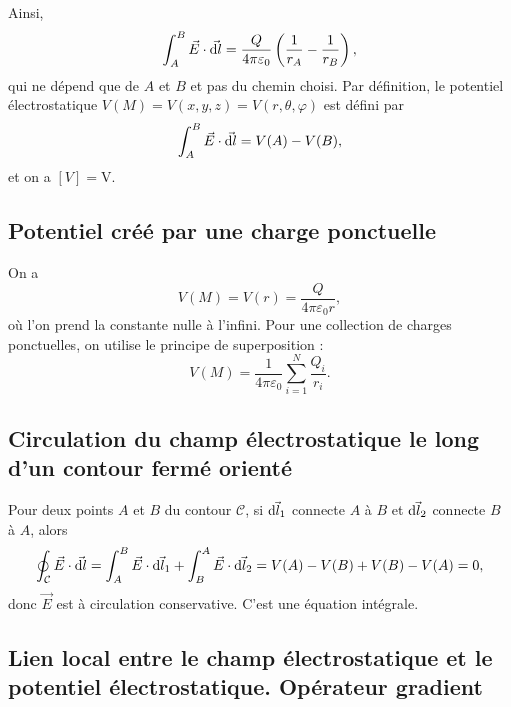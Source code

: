         Ainsi,
        \begin{equation}
            \int_{A}^{B}\vec{E}\cdot\vec{\mathrm{d} l}=\frac{Q}{4\pi\varepsilon_{0}}\left(\frac{1}{r_{A}}-\frac{1}{r_{B}}\right),
        \end{equation}
        qui ne dépend que de $A$ et $B$ et pas du chemin choisi. Par définition, le potentiel électrostatique $V(M)=V(x,y,z)=V(r,\theta,\varphi)$ est défini par 
        \begin{equation}
            \int_{A}^{B}\vec{E}\cdot\vec{\mathrm{d} l}=V(A)-V(B),
        \end{equation}
        et on a $[V]=\si{\volt}$.

    \subsection{Potentiel créé par une charge ponctuelle}

        On a 
        \begin{equation}
            \boxed{
                V(M)=V(r)=\frac{Q}{4\pi\varepsilon_{0}r},
            }
        \end{equation}
        où l'on prend la constante nulle à l'infini. Pour une collection de charges ponctuelles, on utilise le principe de superposition :
        \begin{equation}
            \boxed{
                V(M)=\frac{1}{4\pi\varepsilon_{0}}\sum_{i=1}^{N}\frac{Q_i}{r_i}.
            }
        \end{equation}

    \subsection{Circulation du champ électrostatique le long d'un contour fermé orienté}

        Pour deux points $A$ et $B$ du contour $\mathcal{C}$, si $\vec{\mathrm{d} l_{1}}$ connecte $A$ à $B$ et $\vec{\mathrm{d} l_{2}}$ connecte $B$ à $A$, alors 
        \begin{equation}
            \oint_{\mathcal{C}}\vec{E}\cdot\vec{\mathrm{d} l}=\int_{A}^{B}\vec{E}\cdot\vec{\mathrm{d} l_{1}}+\int_{B}^{A}\vec{E}\cdot\vec{\mathrm{d} l_{2}}=V(A)-V(B)+V(B)-V(A)=0,
        \end{equation}
        donc $\vec{E}$ est à circulation conservative. C'est une équation intégrale.

    \subsection{Lien local entre le champ électrostatique et le potentiel électrostatique. Opérateur gradient}

